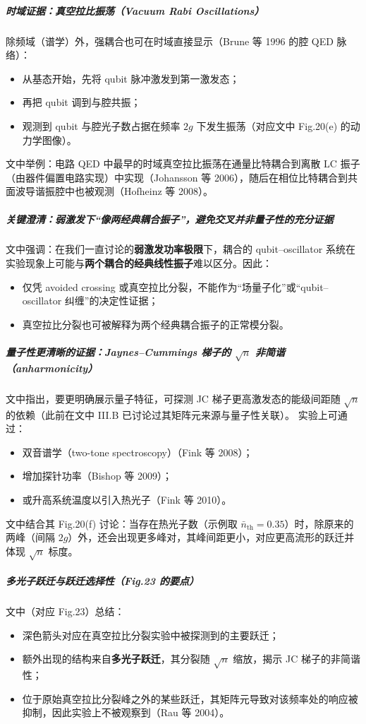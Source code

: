 \documentclass[12pt,a4paper,oneside]{ctexbook}
\let\oldsubparagraph\subparagraph
\renewcommand{\subparagraph}[1]{\oldsubparagraph{#1}\mbox{}}
\begin{document}
\subparagraph{时域证据：真空拉比振荡（Vacuum Rabi Oscillations）}
除频域（谱学）外，强耦合也可在时域直接显示（Brune 等 1996 的腔 QED 脉络）：
\begin{itemize}
\item 从基态开始，先将 qubit 脉冲激发到第一激发态；
\item 再把 qubit 调到与腔共振；
\item 观测到 qubit 与腔光子数占据在频率 $2g$ 下发生振荡（对应文中 Fig.20(e) 的动力学图像）。
\end{itemize}
文中举例：电路 QED 中最早的时域真空拉比振荡在通量比特耦合到离散 LC 振子（由器件偏置电路实现）中实现（Johansson 等 2006），随后在相位比特耦合到共面波导谐振腔中也被观测（Hofheinz 等 2008）。

\subparagraph{关键澄清：弱激发下“像两经典耦合振子”，避免交叉并非量子性的充分证据}
文中强调：在我们一直讨论的\textbf{弱激发功率极限}下，耦合的 qubit--oscillator 系统在实验现象上可能与\textbf{两个耦合的经典线性振子}难以区分。因此：
\begin{itemize}
\item 仅凭 avoided crossing 或真空拉比分裂，不能作为“场量子化”或“qubit--oscillator 纠缠”的决定性证据；
\item 真空拉比分裂也可被解释为两个经典耦合振子的正常模分裂。
\end{itemize}

\subparagraph{量子性更清晰的证据：Jaynes--Cummings 梯子的 $\sqrt{n}$ 非简谐（anharmonicity）}
文中指出，要更明确展示量子特征，可探测 JC 梯子更高激发态的能级间距随 $\sqrt{n}$ 的依赖（此前在文中 III.B 已讨论过其矩阵元来源与量子性关联）。
实验上可通过：
\begin{itemize}
\item 双音谱学（two-tone spectroscopy）（Fink 等 2008）；
\item 增加探针功率（Bishop 等 2009）；
\item 或升高系统温度以引入热光子（Fink 等 2010）。
\end{itemize}
文中结合其 Fig.20(f) 讨论：当存在热光子数（示例取 $\bar n_{\mathrm{th}}=0.35$）时，除原来的两峰（间隔 $2g$）外，还会出现更多峰对，其峰间距更小，对应更高流形的跃迁并体现 $\sqrt{n}$ 标度。

\subparagraph{多光子跃迁与跃迁选择性（Fig.23 的要点）}
文中（对应 Fig.23）总结：
\begin{itemize}
\item 深色箭头对应在真空拉比分裂实验中被探测到的主要跃迁；
\item 额外出现的结构来自\textbf{多光子跃迁}，其分裂随 $\sqrt{n}$ 缩放，揭示 JC 梯子的非简谐性；
\item 位于原始真空拉比分裂峰之外的某些跃迁，其矩阵元导致对该频率处的响应被抑制，因此实验上不被观察到（Rau 等 2004）。
\end{itemize}
\end{document}
